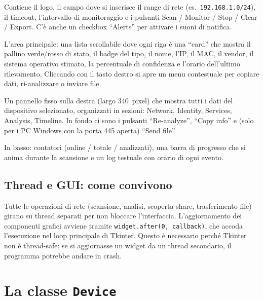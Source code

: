\documentclass[a4paper,11pt]{article}
\begin{document}
\begin{description}[style=nextline, leftmargin=2.5cm]
  \item[Top bar]
    Contiene il logo, il campo dove si inserisce il range di rete
    (es.\ \texttt{192.168.1.0/24}), il timeout, l'intervallo di
    monitoraggio e i pulsanti Scan / Monitor / Stop / Clear /
    Export.  C'è anche un checkbox ``Alerts'' per attivare i
    suoni di notifica.

  \item[Lista dispositivi]
    L'area principale: una lista scrollabile dove ogni riga è
    una ``card'' che mostra il pallino verde/rosso di stato,
    il badge del tipo, il nome, l'IP, il MAC, il vendor, il
    sistema operativo stimato, la percentuale di confidenza
    e l'orario dell'ultimo rilevamento.
    Cliccando con il tasto destro si apre un menu contestuale
    per copiare dati, ri-analizzare o inviare file.

  \item[Pannello dettaglio]
    Un pannello fisso sulla destra (largo 340~pixel) che mostra
    tutti i dati del dispositivo selezionato, organizzati in
    sezioni: Network, Identity, Services, Analysis, Timeline.
    In fondo ci sono i pulsanti ``Re-analyze'', ``Copy info'' e
    (solo per i PC Windows con la porta 445 aperta) ``Send file''.

  \item[Barra di stato]
    In basso: contatori (online / totale / analizzati), una barra
    di progresso che si anima durante la scansione e un log
    testuale con orario di ogni evento.
\end{description}

\subsection{Thread e GUI: come convivono}

Tutte le operazioni di rete (scansione, analisi, scoperta share,
trasferimento file) girano su thread separati per non bloccare
l'interfaccia.  L'aggiornamento dei componenti grafici avviene
tramite \texttt{widget.after(0, callback)}, che accoda l'esecuzione
nel loop principale di Tkinter.  Questo è necessario perché Tkinter
non è thread-safe: se si aggiornasse un widget da un thread
secondario, il programma potrebbe andare in crash.


\section{La classe \texttt{Device}}
\end{document}
